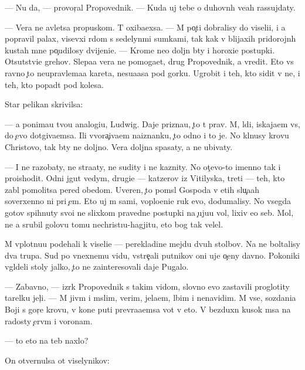 \documentclass[10pt]{book}
\begin{document}
— Nu da, — provor{\c}al Propovednik. — Kuda uj tebe o duhovn{\yi}h ve{\x}ah rassujdaty.

— Vera ne {\y}avl{\ia}{\y}etsa propuskom. T{\yi} oxiba{\y}exsa. — M{\yi} po{\c}ti dobralisy do viseli{\q}i, i {\y}a popravil palax, visevxi{\y} r{\ia}dom s sedelyn{\yi}mi sumkami, tak kak v blija{\y}xih pridorojn{\yi}h kustah mne po{\c}udilosy dvijeni{\y}e. — Krome ne{\y}o doljn{\yi} b{\yi}ty i horoxi{\y}e postupki. Otsutstvi{\y}e grehov. Slepa{\y}a vera ne pomoga{\y}et, drug Propovednik, a vredit. Eto vs{\e} ravno {\c}to neupravl{\ia}{\y}ema{\y}a kareta, nesu{\x}a{\y}asa pod gorku. Ugrobit i teh, kto sidit v ne{\y}, i teh, kto popad{\e}t pod kolesa.

Star{\yi}{\y} pelikan skrivilsa:

— {\Y}a ponima{\y}u tvo{\y}u analogi{\y}u, Ludwig. Daje prizna{\y}u, {\c}to t{\yi} prav. M{\yi}, l{\iu}di, iskaja{\y}em vs{\e}, do {\c}evo dot{\ia}giva{\y}emsa. Ili v{\yi}vora{\c}iva{\y}em naiznanku, {\c}to odno i to je. No kl{\ia}nusy krov{\y}u Christovo{\y}, tak b{\yi}ty ne doljno. Vera doljna spasaty, a ne ubivaty.

— I ne razob{\x}aty, ne stra{\x}aty, ne sudity i ne kaznity. No ot{\c}evo-to imenno tak i proishodit. Odni jgut vedym, drugi{\y}e — katzerov iz Vitilyska, tret{\yf}i — teh, kto zab{\yi}l pomolitsa pered obedom. Uveren, {\c}to pom{\yi}sl{\yi} Gospoda v etih slu{\c}a{\y}ah soverxenno ni pri {\c}em. Eto uj m{\yi} sami, voplo{\x}eni{\y}e ruk {\y}evo, dodumalisy. No vsegda gotov{\yi} spihnuty svo{\y}i ne slixkom pravedn{\yi}{\y}e postupki na {\c}uju{\y}u vol{\iu}, lixiv {\y}e{\y}o seb{\ia}. Mol, ne {\y}a srubil golovu tomu nechrist{\i}u-hagjitu, eto bog tak velel.

M{\yi} vplotnu{\y}u pod{\y}ehali k viseli{\q}e — perekladine mejdu dvuh stolbov. Na ne{\y} boltalisy dva trupa. Sud{\ia} po vnexnemu vidu, vstre{\c}ali putnikov oni uje o{\c}eny davno. Poko{\y}niki v{\yi}gl{\ia}deli stoly jalko, {\c}to ne zainteresovali daje Pugalo.

— Zabavno, — izr{\e}k Propovednik s takim vidom, slovno {\y}evo zastavili proglotity tarelku jel{\c}i. — M{\yi} jiv{\e}m i m{\yi}slim, verim, jela{\y}em, l{\iu}bim i nenavidim. M{\yi} vse, sozdani{\y}a Boj{\yf}i s gor{\ia}{\c}e{\y} krov{\y}u, v kon{\q}e puti prevra{\x}a{\y}emsa vot v eto. V bezduxn{\yi}{\y} kusok m{\ia}sa na radosty {\c}erv{\ia}m i voronam.

— {\C}to eto na teb{\ia} naxlo?

On otvernulsa ot viselynikov:
\end{document}
